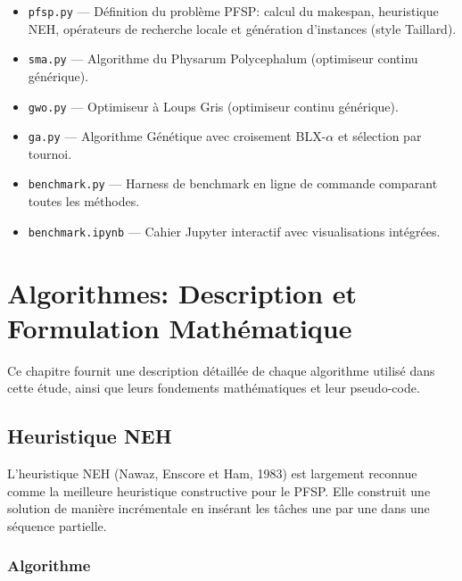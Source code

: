 \documentclass[12pt,a4paper,oneside]{report}
\begin{document}
\begin{itemize}
    \item \texttt{pfsp.py} — D\'efinition du probl\`eme PFSP: calcul du makespan, heuristique NEH, op\'erateurs de recherche locale et g\'en\'eration d'instances (style Taillard).
    \item \texttt{sma.py} — Algorithme du Physarum Polycephalum (optimiseur continu g\'en\'erique).
    \item \texttt{gwo.py} — Optimiseur \`a Loups Gris (optimiseur continu g\'en\'erique).
    \item \texttt{ga.py} — Algorithme G\'en\'etique avec croisement BLX-$\alpha$ et s\'election par tournoi.
    \item \texttt{benchmark.py} — Harness de benchmark en ligne de commande comparant toutes les m\'ethodes.
    \item \texttt{benchmark.ipynb} — Cahier Jupyter interactif avec visualisations int\'egr\'ees.
\end{itemize}

\clearpage

\chapter{Algorithmes: Description et Formulation Math\'ematique}

Ce chapitre fournit une description d\'etaill\'ee de chaque algorithme utilis\'e dans cette \'etude, ainsi que leurs fondements math\'ematiques et leur pseudo-code.

\section{Heuristique NEH}

L'heuristique NEH (Nawaz, Enscore et Ham, 1983) est largement reconnue comme la meilleure heuristique constructive pour le PFSP. Elle construit une solution de mani\`ere incr\'ementale en ins\'erant les t\^aches une par une dans une s\'equence partielle.

\subsection{Algorithme}
\end{document}
